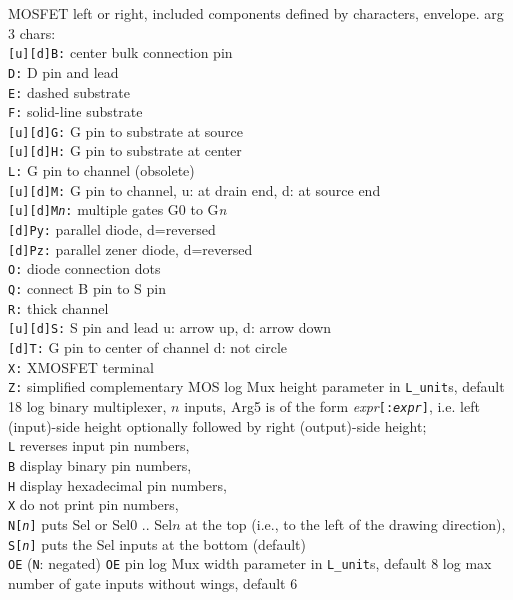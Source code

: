   {MOSFET left or right, included components defined by characters,
  envelope.
   arg 3 chars:\\
   {\tt [u][d]B:} center bulk connection pin\\
   {\tt D:} D pin and lead\\
   {\tt E:} dashed substrate\\
   {\tt F:} solid-line substrate\\
   {\tt [u][d]G:} G pin to substrate at source\\
   {\tt [u][d]H:} G pin to substrate at center\\
   {\tt L:} G pin to channel (obsolete)\\
   {\tt [u][d]M:} G pin to channel, u: at drain end, d: at source end\\
   {\tt [u][d]M{\sl n}:} multiple gates G0 to G{\sl n}\\
   {\tt [d]Py:} parallel diode, d=reversed\\
   {\tt [d]Pz:} parallel zener diode, d=reversed\\
   {\tt O:} diode connection dots\\
   {\tt Q:} connect B pin to S pin\\
   {\tt R:} thick channel\\
   {\tt [u][d]S:} S pin and lead u: arrow up, d: arrow down\\
   {\tt [d]T:} G pin to center of channel d: not circle\\
   {\tt X:} XMOSFET terminal\\
   {\tt Z:} simplified complementary MOS
   }%
%
  {log}%
  {Mux height parameter in {\tt L\_unit}s, default 18}%
%
  {log}%
  {binary multiplexer, $n$ inputs,
    Arg5 is of the form {\sl expr}{\tt [:{\sl expr}]}, i.e. left (input)-side
     height optionally followed by right (output)-side height;\\
    {\tt L} reverses input pin numbers,\\
    {\tt B} display binary pin numbers,\\
    {\tt H} display hexadecimal pin numbers,\\
    {\tt X} do not print pin numbers,\\
    {\tt N[{\sl n}]} puts Sel or Sel$0$ .. Sel$n$
    at the top (i.e., to the left of the drawing direction),\\
    {\tt S[{\sl n}]} puts the Sel inputs at the bottom (default)\\
    {\tt OE} ({\tt N}: negated) {\tt OE} pin }%
%
  {log}%
  {Mux width parameter in {\tt L\_unit}s, default 8}%
%
  {log}%
  {max number of gate inputs without wings, default 6}%

